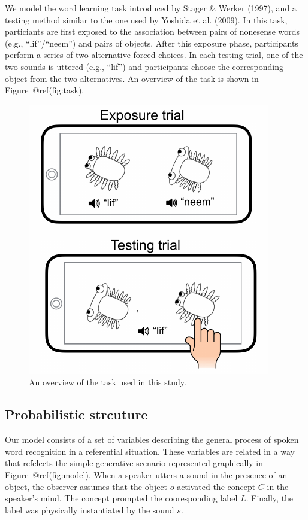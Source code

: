 \documentclass[10pt, letterpaper]{article}
\newenvironment{CodeChunk}{}{}
\begin{document}
We model the word learning task introduced by Stager \& Werker (1997),
and a testing method similar to the one used by Yoshida et al. (2009).
In this task, particiants are first exposed to the association between
pairs of nonesense words (e.g., ``lif''/``neem'') and pairs of objects.
After this exposure phase, participants perform a series of
two-alternative forced choices. In each testing trial, one of the two
sounds is uttered (e.g., ``lif'') and participants choose the
corresponding object from the two alternatives. An overview of the task
is shown in Figure~@ref(fig:task).

\begin{CodeChunk}
\begin{figure}[t]

{\centering \includegraphics{figs/task-1} 

}

\caption{\label{fig:task}An overview of the task used in this study.}\label{fig:task}
\end{figure}
\end{CodeChunk}

\subsection{Probabilistic strcuture}\label{probabilistic-strcuture}

Our model consists of a set of variables describing the general process
of spoken word recognition in a referential situation. These variables
are related in a way that refelects the simple generative scenario
represented graphically in Figure~@ref(fig:model). When a speaker utters
a sound in the presence of an object, the observer assumes that the
object \(o\) activated the concept \(C\) in the speaker's mind. The
concept prompted the cooresponding label \(L\). Finally, the label was
physically instantiated by the sound \(s\).
\end{document}
